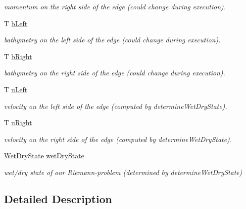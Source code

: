 \begin{DoxyCompactItemize}
\begin{DoxyCompactList}\small\item\em momentum on the right side of the edge (could change during execution). \end{DoxyCompactList}\item 
T \hyperlink{classsolver_1_1WavePropagation_a809a5429a8d62ea7308611ed600ba679}{b\+Left}
\begin{DoxyCompactList}\small\item\em bathymetry on the left side of the edge (could change during execution). \end{DoxyCompactList}\item 
T \hyperlink{classsolver_1_1WavePropagation_a36a205e462d5775b7b343e25ab390e61}{b\+Right}
\begin{DoxyCompactList}\small\item\em bathymetry on the right side of the edge (could change during execution). \end{DoxyCompactList}\item 
T \hyperlink{classsolver_1_1WavePropagation_a987c0fc517379375f8120207a8af47d2}{u\+Left}
\begin{DoxyCompactList}\small\item\em velocity on the left side of the edge (computed by determine\+Wet\+Dry\+State). \end{DoxyCompactList}\item 
T \hyperlink{classsolver_1_1WavePropagation_a9689ef10a5ad6ab07054a34c9cdcc678}{u\+Right}
\begin{DoxyCompactList}\small\item\em velocity on the right side of the edge (computed by determine\+Wet\+Dry\+State). \end{DoxyCompactList}\item 
\hyperlink{classsolver_1_1WavePropagation_a301203f09c080cff1f7f654ba04451cd}{Wet\+Dry\+State} \hyperlink{classsolver_1_1WavePropagation_a5765dc8464b2046ac74631819b22c9eb}{wet\+Dry\+State}
\begin{DoxyCompactList}\small\item\em wet/dry state of our Riemann-\/problem (determined by determine\+Wet\+Dry\+State) \end{DoxyCompactList}\end{DoxyCompactItemize}


\subsection{Detailed Description}
